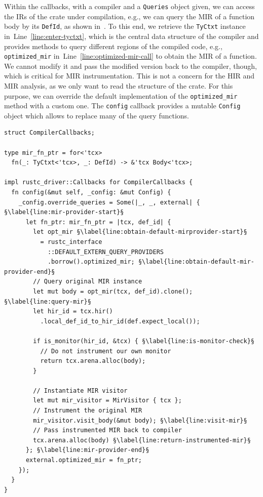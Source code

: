 \documentclass[paper=a4,%
  twoside,%
  BCOR4mm,%
  abstract=true,%
  toc=bibliography,%
  chapterprefix=true,%
  toc=bibliographynumbered,%
  open=right,%
  english,%
  pagesize=pdftex]{scrreprt}
\newcommand{\hir}{\ac{HIR}\xspace}
\newcommand{\mir}{\ac{MIR}\xspace}
\begin{document}
Within the callbacks, with a compiler and a \texttt{Queries} object given, we can access the \acp{IR} of the crate under compilation, e.g., we can query the \mir of a function body by its \texttt{DefId}, as shown in~. To this end, we retrieve the \texttt{TyCtxt} instance in~Line~\ref{line:enter-tyctxt}, which is the central data structure of the compiler and provides methods to query different regions of the compiled code, e.g., \texttt{optimized\string_mir} in~Line~\ref{line:optimized-mir-call} to obtain the \mir of a function. We cannot modify it and pass the modified version back to the compiler, though, which is critical for \mir instrumentation. This is not a concern for the \hir and \mir analysis, as we only want to read the structure of the crate. For this purpose, we can override the default implementation of the \texttt{optimized\string_mir} method with a custom one. The \texttt{config} callback provides a mutable \texttt{Config} object which allows to replace many of the query functions.

\begin{lstlisting}[style=boxed, caption={The Rust compiler interface accepts an object which implements its callback trait, allowing us to execute code at different compilation phases}, label=lst:compiler-callbacks, escapechar=§]
struct CompilerCallbacks;

type mir_fn_ptr = for<'tcx>
  fn(_: TyCtxt<'tcx>, _: DefId) -> &'tcx Body<'tcx>;

impl rustc_driver::Callbacks for CompilerCallbacks {
  fn config(&mut self, _config: &mut Config) {
    _config.override_queries = Some(|_, _, external| { §\label{line:mir-provider-start}§
      let fn_ptr: mir_fn_ptr = |tcx, def_id| {
        let opt_mir §\label{line:obtain-default-mirprovider-start}§
          = rustc_interface
            ::DEFAULT_EXTERN_QUERY_PROVIDERS
            .borrow().optimized_mir; §\label{line:obtain-default-mir-provider-end}§
        // Query original MIR instance
        let mut body = opt_mir(tcx, def_id).clone(); §\label{line:query-mir}§
        let hir_id = tcx.hir()
          .local_def_id_to_hir_id(def.expect_local());

        if is_monitor(hir_id, &tcx) { §\label{line:is-monitor-check}§
          // Do not instrument our own monitor
          return tcx.arena.alloc(body);
        }

        // Instantiate MIR visitor
        let mut mir_visitor = MirVisitor { tcx };
        // Instrument the original MIR
        mir_visitor.visit_body(&mut body); §\label{line:visit-mir}§
        // Pass instrumented MIR back to compiler
        tcx.arena.alloc(body) §\label{line:return-instrumented-mir}§
      }; §\label{line:mir-provider-end}§
      external.optimized_mir = fn_ptr;
    });
  }
}
\end{lstlisting}
\end{document}

